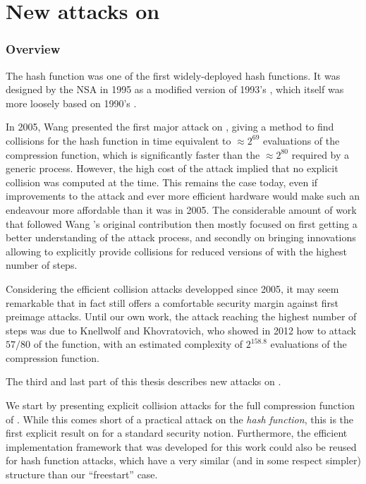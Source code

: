 \part[Nouvelles attaques sur \shaone]
    {New attacks on \shaone} 
\label{part:sha-1}

\section*{Overview}

The \shaone hash function was one of the first widely-deployed hash functions. It was designed by the NSA in 1995 as a modified version of 1993's \shazero, which itself
was more loosely based on 1990's \mdfour.

In 2005, Wang \etal presented the first major attack on \shaone, giving a method to find collisions for the hash function
in time equivalent to $\approx 2^{69}$ evaluations of the compression function, which is significantly faster than the $\approx 2^{80}$ required by a generic process.
However, the high cost of the attack implied that no explicit collision was computed at the time. This remains the case today, even if improvements to the attack
and ever more efficient hardware would make such an endeavour more affordable than it was in 2005.
The considerable amount of work that followed Wang \etal's original contribution then mostly focused on first getting a better understanding of the attack process, and
secondly on bringing innovations allowing to explicitly provide collisions for reduced versions of \shaone with the highest number of steps. 

Considering the efficient collision attacks developped since 2005, it may seem remarkable that \shaone
in fact still offers a comfortable security margin against first preimage attacks. Until our own work,
the attack reaching the highest number of steps was due to Knellwolf and Khovratovich, who showed in 2012 how to attack $57/80$ of the function, with an estimated
complexity of $2^{158.8}$ evaluations of the compression function.


\bigskip

The third and last part of this thesis describes new attacks on \shaone.

We start by presenting explicit collision attacks for the full compression function of \shaone. While this comes short of a practical
attack on the \emph{hash function}, this is the first explicit result on \shaone for a standard security notion. Furthermore, the efficient implementation framework that was developed
for this work could also be reused for hash function attacks, which have a very similar (and in some respect simpler) structure than our ``freestart'' case.

